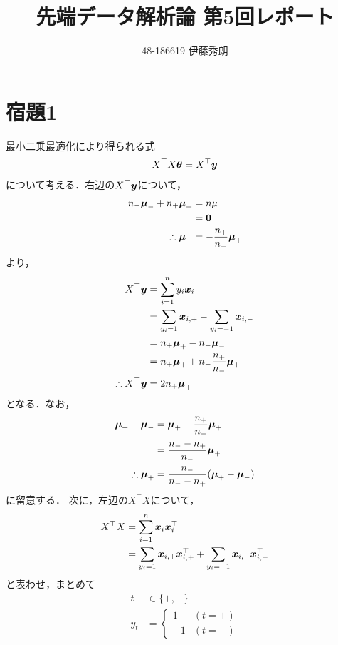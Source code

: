 \documentclass[onecolumn]{preport}
\title{先端データ解析論 第5回レポート}
\author{48-186619 伊藤秀朗}
\def\vector#1{\mbox{\boldmath $#1$}}
\begin{document}
\pagestyle{empty}
\maketitle
\thispagestyle{empty}
\sloppy

\section{宿題1}

\def\Xt{X^\top}
\def\x{\vector{x}}
\def\xt{\vector{x}^\top}
\def\y{\vector{y}}
\def\thv{\vector{\theta}}
\def\muv{\vector{\mu}}
\def\mumin{\vector{\mu}_{-}}
\def\muplus{\vector{\mu}_{+}}
\def\nt{n_t}
\def\nmin{n_{-}}
\def\nplus{n_{+}}

最小二乗最適化により得られる式
\begin{align}
  \Xt X \thv = \Xt \y \label{equation:problem}
\end{align}
について考える．右辺の\(\Xt \y\)について，
\begin{align}
  \nmin \mumin + \nplus \muplus &= n \mu \\
  &= \vector{0} \\
  \therefore \mumin &= - \frac{\nplus}{\nmin} \muplus
\end{align}
より，
\begin{align}
  \Xt \y &= \sum_{i=1}^n{y_i \x_i} \\
  &= \sum_{y_i=1}{\x_{i, +}} - \sum_{y_i=-1}{\x_{i, -}} \\
  &= \nplus \muplus - \nmin \mumin \\
  &= \nplus \muplus + \nmin \frac{\nplus}{\nmin} \muplus \\
  \therefore \Xt \y &= 2 \nplus \muplus
\end{align}
となる．なお，
\begin{align}
  \muplus - \mumin &= \muplus - \frac{\nplus}{\nmin} \muplus \\
  &= \frac{\nmin - \nplus}{\nmin} \muplus \\
  \therefore \muplus &= \frac{\nmin}{\nmin - \nplus} (\muplus - \mumin) \label{equation:mu}
\end{align}
に留意する．
次に，左辺の\(\Xt X\)について，
\begin{align}
  \Xt X &= \sum_{i=1}^{n}{\x_i \xt_i} \\
  &= \sum_{y_i=1}{\x_{i, +} \xt_{i, +}} + \sum_{y_i=-1}{\x_{i, -} \xt_{i, -}}
\end{align}
と表わせ，まとめて
\begin{align}
  t &\in \{+, -\} \nonumber \\
  y_t &= \begin{cases} 1 & (t=+) \\ -1 & (t=-) \end{cases} \nonumber
\end{align}
\end{document}
